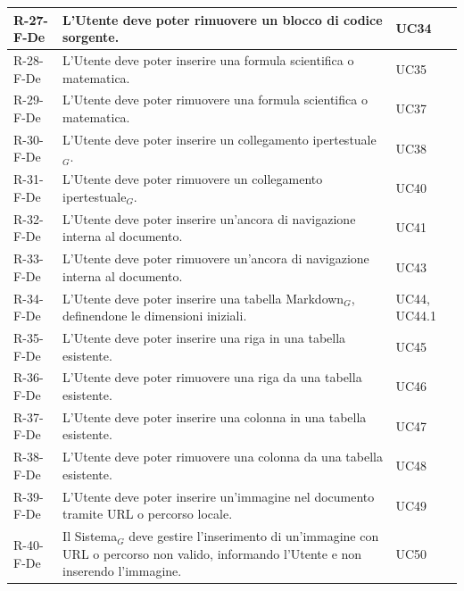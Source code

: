 \documentclass[a4paper, 10pt]{article}
\begin{document}
\begin{longtable}{|p{2.2cm}|p{7.5cm}|p{4cm}|}
R-27-F-De & L'Utente deve poter rimuovere un blocco di codice sorgente. & UC34 \\ \hline

R-28-F-De & L'Utente deve poter inserire una formula scientifica o matematica. & UC35 \\ \hline

R-29-F-De & L'Utente deve poter rimuovere una formula scientifica o matematica. & UC37 \\ \hline

R-30-F-De & L'Utente deve poter inserire un collegamento ipertestuale$_G$. & UC38 \\ \hline

R-31-F-De & L'Utente deve poter rimuovere un collegamento ipertestuale$_G$. & UC40 \\ \hline

R-32-F-De & L'Utente deve poter inserire un'ancora di navigazione interna al documento. & UC41 \\ \hline

R-33-F-De & L'Utente deve poter rimuovere un'ancora di navigazione interna al documento. & UC43 \\ \hline

R-34-F-De & L'Utente deve poter inserire una tabella Markdown$_G$, definendone le dimensioni iniziali. & UC44, UC44.1 \\ \hline

R-35-F-De & L'Utente deve poter inserire una riga in una tabella esistente. & UC45 \\ \hline

R-36-F-De & L'Utente deve poter rimuovere una riga da una tabella esistente. & UC46 \\ \hline

R-37-F-De & L'Utente deve poter inserire una colonna in una tabella esistente. & UC47 \\ \hline

R-38-F-De & L'Utente deve poter rimuovere una colonna da una tabella esistente. & UC48 \\ \hline

R-39-F-De & L'Utente deve poter inserire un'immagine nel documento tramite URL o percorso locale. & UC49 \\ \hline

R-40-F-De & Il Sistema$_G$ deve gestire l'inserimento di un'immagine con URL o percorso non valido, informando l'Utente e non inserendo l'immagine. & UC50 \\ \hline


\end{longtable}
\end{document}
